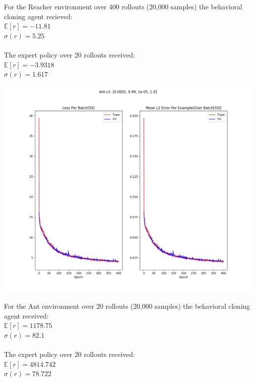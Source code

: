 \documentclass[12pt]{report}
\begin{document}
For the Reacher environment over 400 rollouts (20,000 samples) the behavioral cloning agent recieved:\\
$\mathbb{E}[r]=-11.81$\\
$\sigma(r) =  5.25$\\
\\
The expert policy over 20 rollouts received:\\
$\mathbb{E}[r]=-3.9318$\\
$\sigma(r) =  1.617$\\
\newpage
\begin{center}
\includegraphics[scale=.6]{./images/ant_train_summary.png}
\end{center}
For the Ant environment over 20 rollouts (20,000 samples) the behavioral cloning agent received:\\
$\mathbb{E}[r]=1178.75$\\
$\sigma(r) =   82.1$\\
\\
The expert policy over 20 rollouts received:\\
$\mathbb{E}[r]=4814.742$\\
$\sigma(r) =   78.722$\\
\end{document}
